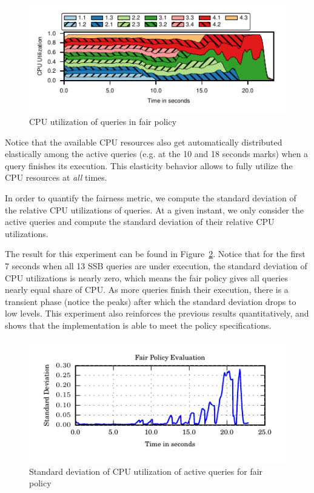 \begin{figure}[t]
	\centering
	\includegraphics[width=\columnwidth]{policy/figures/ssb-all-uniform-fair-cpu-util.pdf}
	\caption{CPU utilization of queries in fair policy}
	\label{fig:fair-cpu-util}
\end{figure}

Notice that the available CPU resources also get automatically distributed elastically among the active queries (e.g. at the 10 and 18 seconds marks) when a query finishes its execution. 
This elasticity behavior allows \sys{} to fully utilize the CPU resources at \textit{all} times.

In order to quantify the fairness metric, we compute the standard deviation of the relative CPU utilizations of queries.
At a given instant, we only consider the active queries and compute the standard deviation of their relative CPU utilizations. 

The result for this experiment can be found in Figure~\ref{fig:stddev-active-queries-fair}.
Notice that for the first 7 seconds when all 13 SSB queries are under execution, the standard deviation of CPU utilizations is nearly zero, which means the fair policy gives all queries nearly equal share of CPU. 
As more queries finish their execution, there is a transient phase (notice the peaks) after which the standard deviation drops to low levels. 
This experiment also reinforces the previous results quantitatively, and shows that the implementation is able to meet the policy specifications.

\begin{figure}[t]
	\centering
	\includegraphics[width=\columnwidth]{policy/figures/fair-stddev}
	\caption{Standard deviation of CPU utilization of active queries for fair policy}
	\label{fig:stddev-active-queries-fair}
\end{figure}

